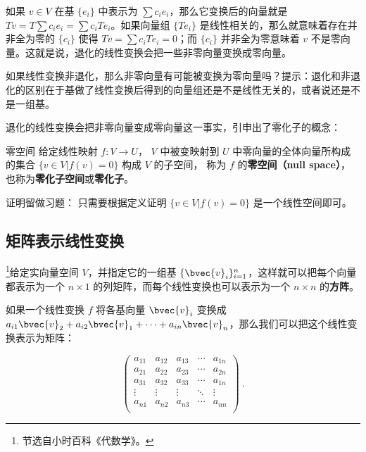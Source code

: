 如果 ${v}\in V$ 在基 $\{{e}_i\}$ 中表示为 $\sum c_i {e}_i$，那么它变换后的向量就是 $T {v}=T\sum c_i {e}_i=\sum c_iT {e}_i$。如果向量组 $\{T {e}_i\}$ 是线性相关的，那么就意味着存在并非全为零的 $\{c_i\}$ 使得 $T {v}=\sum c_iT {e}_i=0$；而 $\{c_i\}$ 并非全为零意味着 ${v}$ 不是零向量。这就是说，退化的线性变换会把一些非零向量变换成零向量。

\begin{exercise}{}
如果线性变换非退化，那么非零向量有可能被变换为零向量吗？提示：退化和非退化的区别在于基做了线性变换后得到的向量组还是不是线性无关的，或者说还是不是一组基。
\end{exercise}

退化的线性变换会把非零向量变成零向量这一事实，引申出了零化子的概念：

\begin{theorem}{零空间}\label{the_LinMap_1}
给定线性映射 $f:V\to U$， $V$ 中被变映射到 $U$ 中零向量的全体向量所构成的集合 $\{{v}\in V|f(v)= 0\}$ 构成 $V$ 的子空间， 称为 $f$ 的\textbf{零空间（null space）}， 也称为\textbf{零化子空间}或\textbf{零化子}。
\end{theorem}
证明留做习题： 只需要根据定义证明 $\{{v}\in V|f(v)= 0\}$ 是一个线性空间即可。 


\subsection{矩阵表示线性变换}

\footnote{节选自小时百科《代数学》。}给定实向量空间 $V$，并指定它的一组基 $\{\bvec{v}_i\}_{i=1}^n$，这样就可以把每个向量都表示为一个 $n\times 1$ 的列矩阵，而每个线性变换也可以表示为一个 $n\times n$ 的\textbf{方阵}。

如果一个线性变换 $f$ 将各基向量 $\bvec{v}_i$ 变换成 $a_{i1}\bvec{v}_2+a_{i2}\bvec{v}_1+\cdots+a_{in}\bvec{v}_n$，那么我们可以把这个线性变换表示为矩阵：

\begin{equation}
    \begin{pmatrix}
    a_{11}&a_{12}&a_{13}&\cdots&a_{1n}\\
    a_{21}&a_{22}&a_{23}&\cdots&a_{2n}\\
    a_{31}&a_{32}&a_{33}&\cdots&a_{1n}\\
    \vdots&\vdots&\vdots&\ddots&\vdots\\
    a_{n1}&a_{n2}&a_{n3}&\cdots&a_{nn}\\
    \end{pmatrix}~.
\end{equation}


